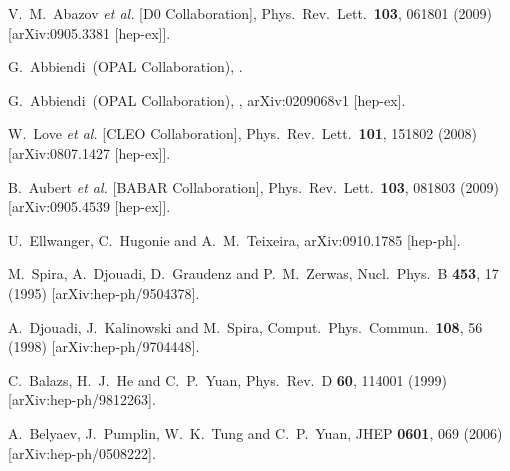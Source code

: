 \documentclass[aps,prl,nofootinbib,superscriptaddress]{revtex4}
\begin{document}
\begin{thebibliography}{99}
  V.~M.~Abazov {\it et al.}  [D0 Collaboration],
  Phys.\ Rev.\ Lett.\  {\bf 103}, 061801 (2009)
  [arXiv:0905.3381 [hep-ex]].

 G.~Abbiendi~\etal (OPAL Collaboration),
.

 G.~Abbiendi~\etal (OPAL Collaboration),
, arXiv:0209068v1 [hep-ex].

  W.~Love {\it et al.}  [CLEO Collaboration],
  Phys.\ Rev.\ Lett.\  {\bf 101}, 151802 (2008)
  [arXiv:0807.1427 [hep-ex]].

  B.~Aubert {\it et al.}  [BABAR Collaboration],
  Phys.\ Rev.\ Lett.\  {\bf 103}, 081803 (2009)
  [arXiv:0905.4539 [hep-ex]].

  U.~Ellwanger, C.~Hugonie and A.~M.~Teixeira,
  arXiv:0910.1785 [hep-ph].

  M.~Spira, A.~Djouadi, D.~Graudenz and P.~M.~Zerwas,
  Nucl.\ Phys.\  B {\bf 453}, 17 (1995)
  [arXiv:hep-ph/9504378].

  A.~Djouadi, J.~Kalinowski and M.~Spira,
  Comput.\ Phys.\ Commun.\  {\bf 108}, 56 (1998)
  [arXiv:hep-ph/9704448].

  C.~Balazs, H.~J.~He and C.~P.~Yuan,
  Phys.\ Rev.\  D {\bf 60}, 114001 (1999)
  [arXiv:hep-ph/9812263].
  
  
  A.~Belyaev, J.~Pumplin, W.~K.~Tung and C.~P.~Yuan,
  JHEP {\bf 0601}, 069 (2006)
  [arXiv:hep-ph/0508222].


\end{thebibliography}
\end{document}
